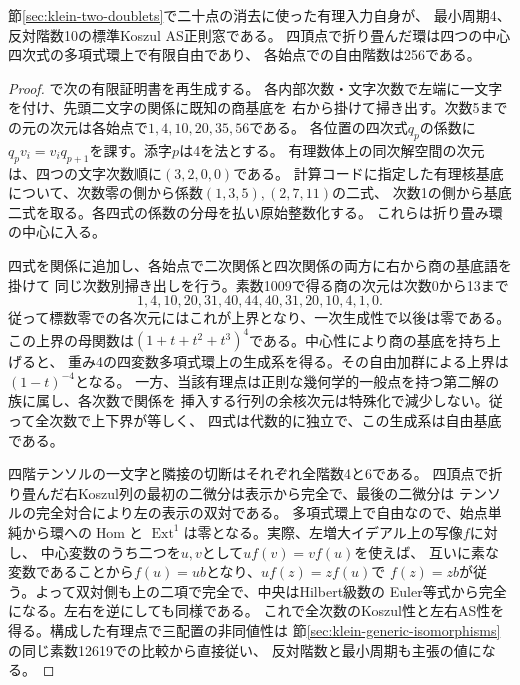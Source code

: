 \begin{theorem}\label{thm:klein-rational-period-four}
節\ref{sec:klein-two-doublets}で二十点の消去に使った有理入力自身が、
最小周期4、反対階数10の標準Koszul AS正則窓である。
四頂点で折り畳んだ環は四つの中心四次式の多項式環上で有限自由であり、
各始点での自由階数は256である。
\end{theorem}
\begin{proof}
で次の有限証明書を再生成する。
各内部次数・文字次数で左端に一文字を付け、先頭二文字の関係に既知の商基底を
右から掛けて掃き出す。次数5までの元の次元は各始点で$1,4,10,20,35,56$である。
各位置の四次式$q_p$の係数に$ q_p v_i=v_i q_{p+1}$を課す。添字$p$は4を法とする。
有理数体上の同次解空間の次元は、四つの文字次数順に$(3,2,0,0)$である。
計算コードに指定した有理核基底について、次数零の側から係数$(1,3,5),(2,7,11)$の二式、
次数1の側から基底二式を取る。各四式の係数の分母を払い原始整数化する。
これらは折り畳み環の中心に入る。

四式を関係に追加し、各始点で二次関係と四次関係の両方に右から商の基底語を掛けて
同じ次数別掃き出しを行う。素数1009で得る商の次元は次数0から13まで
\[
 1,4,10,20,31,40,44,40,31,20,10,4,1,0.
\]
従って標数零での各次元にはこれが上界となり、一次生成性で以後は零である。
この上界の母関数は$(1+t+t^2+t^3)^4$である。中心性により商の基底を持ち上げると、
重み4の四変数多項式環上の生成系を得る。その自由加群による上界は$(1-t)^{-4}$となる。
一方、当該有理点は正則な幾何学的一般点を持つ第二解の族に属し、各次数で関係を
挿入する行列の余核次元は特殊化で減少しない。従って全次数で上下界が等しく、
四式は代数的に独立で、この生成系は自由基底である。

四階テンソルの一文字と隣接の切断はそれぞれ全階数4と6である。
四頂点で折り畳んだ右Koszul列の最初の二微分は表示から完全で、最後の二微分は
テンソルの完全対合により左の表示の双対である。
多項式環上で自由なので、始点単純から環への$\operatorname{Hom}$と
$\operatorname{Ext}^1$は零となる。実際、左増大イデアル上の写像$f$に対し、
中心変数のうち二つを$u,v$として$u f(v)=v f(u)$を使えば、
互いに素な変数であることから$f(u)=u b$となり、$u f(z)=z f(u)$で
$f(z)=zb$が従う。よって双対側も上の二項で完全で、中央はHilbert級数の
Euler等式から完全になる。左右を逆にしても同様である。
これで全次数のKoszul性と左右AS性を得る。構成した有理点で三配置の非同値性は
節\ref{sec:klein-generic-isomorphisms}の同じ素数12619での比較から直接従い、
反対階数と最小周期も主張の値になる。
\end{proof}
